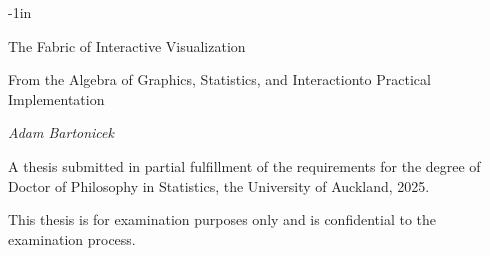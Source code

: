 \begin{adjustwidth}{}{-1in}

\thispagestyle{empty}

\begin{center}

\vspace*{5\baselineskip}

{\huge The Fabric of Interactive Visualization \par}

\vspace*{1\baselineskip}

\large{From the Algebra of Graphics, Statistics, and Interaction\break to Practical Implementation}

\vspace*{2\baselineskip}

\large{\textit{Adam Bartonicek}}

\vspace*{16\baselineskip}

\begin{minipage}{0.8\linewidth}

\normalsize{A thesis submitted in partial fulfillment of the requirements for the degree of Doctor of Philosophy in Statistics, the University of Auckland, 2025.}

\vspace*{2\baselineskip}

\normalsize{This thesis is for examination purposes only and is confidential to the examination process.}

\end{minipage}

\end{center}

\end{adjustwidth}
